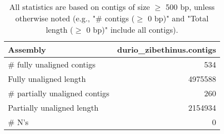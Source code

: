 \documentclass[12pt,a4paper]{article}
\begin{document}
\begin{table}[ht]
\begin{center}
\caption{All statistics are based on contigs of size $\geq$ 500 bp, unless otherwise noted (e.g., "\# contigs ($\geq$ 0 bp)" and "Total length ($\geq$ 0 bp)" include all contigs).}
\begin{tabular}{|l*{1}{|r}|}
\hline
Assembly & durio\_zibethinus.contigs \\ \hline
\# fully unaligned contigs & 534 \\ \hline
Fully unaligned length & 4975588 \\ \hline
\# partially unaligned contigs & 260 \\ \hline
Partially unaligned length & 2154934 \\ \hline
\# N's & 0 \\ \hline
\end{tabular}
\end{center}
\end{table}
\end{document}
